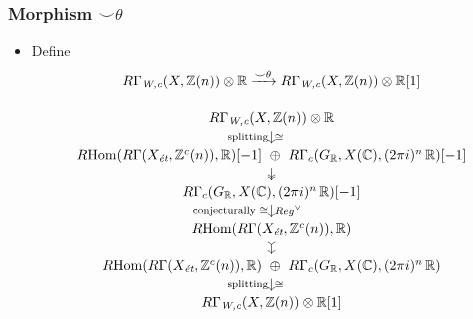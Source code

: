 \documentclass[handout]{beamer}
\newcommand{\ZZ}{\mathbb{Z}}
\newcommand{\RR}{\mathbb{R}}
\newcommand{\CC}{\mathbb{C}}
\newcommand{\isom}{\cong}
\DeclareMathOperator{\Hom}{Hom}
\newcommand{\RHom}{R\!\Hom}
\begin{document}
\begin{frame}
  \frametitle{Morphism $\smile\theta$}

  \begin{itemize}
  \item<2-> Define
    $$R\Gamma_\text{\it W,c} (X, \ZZ(n)) \otimes \RR \xrightarrow{\smile\theta}
    R\Gamma_\text{\it W,c} (X, \ZZ(n)) \otimes \RR [1]$$

    \[ \begin{tikzcd}[row sep=small]
        R\Gamma_\text{\it W,c} (X, \ZZ (n)) \otimes \RR \ar{d}{\isom}[swap]{\text{splitting}} \\
        \RHom (R\Gamma (X_\text{\it ét}, \ZZ^c (n)), \RR) [-1] ~\oplus~ R\Gamma_c (G_\RR, X (\CC), (2\pi i)^n\,\RR) [-1] \ar[twoheadrightarrow]{d} \\
        R\Gamma_c (G_\RR, X (\CC), (2\pi i)^n\,\RR) [-1] \ar{d}{Reg^\vee}[swap]{\text{conjecturally }\isom}\\
        \RHom (R\Gamma (X_\text{\it ét}, \ZZ^c (n)), \RR) \ar[rightarrowtail]{d} \\
        \RHom (R\Gamma (X_\text{\it ét}, \ZZ^c (n)), \RR) ~\oplus~ R\Gamma_c (G_\RR, X (\CC), (2\pi i)^n\,\RR) \ar{d}{\isom}[swap]{\text{splitting}} \\
        R\Gamma_\text{\it W,c} (X, \ZZ (n)) \otimes \RR [1]
      \end{tikzcd} \]
  \end{itemize}
\end{frame}

\end{document}
